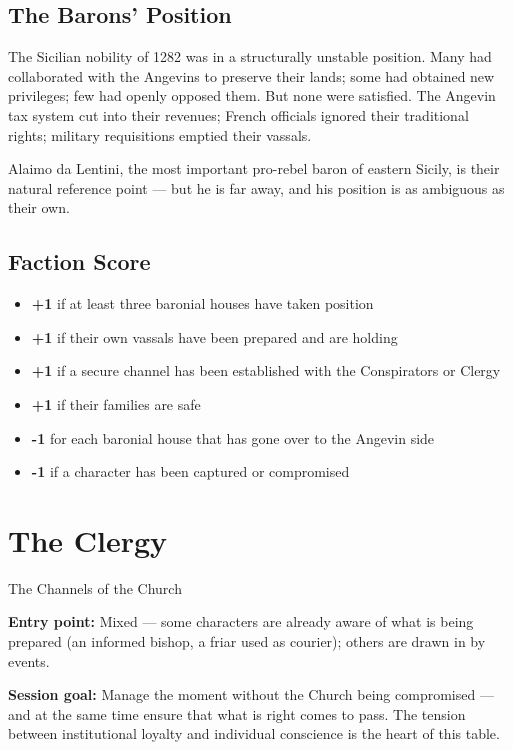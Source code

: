 \subsection{The Barons' Position}

The Sicilian nobility of 1282 was in a structurally unstable position.
Many had collaborated with the Angevins to preserve their lands; some
had obtained new privileges; few had openly opposed them. But none were
satisfied. The Angevin tax system cut into their revenues; French officials
ignored their traditional rights; military requisitions emptied their
vassals.

Alaimo da Lentini, the most important pro-rebel baron of eastern Sicily,
is their natural reference point --- but he is far away, and his position
is as ambiguous as their own.

\subsection{Faction Score}

\begin{itemize}[nosep]
  \item \textbf{+1} if at least three baronial houses have taken position
  \item \textbf{+1} if their own vassals have been prepared and are holding
  \item \textbf{+1} if a secure channel has been established with the
    Conspirators or Clergy
  \item \textbf{+1} if their families are safe
  \item \textbf{-1} for each baronial house that has gone over to the
    Angevin side
  \item \textbf{-1} if a character has been captured or compromised
\end{itemize}

\secsep

\section{The Clergy}
\textcolor{oro}{\cinzel\large The Channels of the Church}

\filetto

\textbf{Entry point:} Mixed --- some characters are already aware of
what is being prepared (an informed bishop, a friar used as courier);
others are drawn in by events.

\textbf{Session goal:} Manage the moment without the Church being
compromised --- and at the same time ensure that what is right comes
to pass. The tension between institutional loyalty and individual
conscience is the heart of this table.

